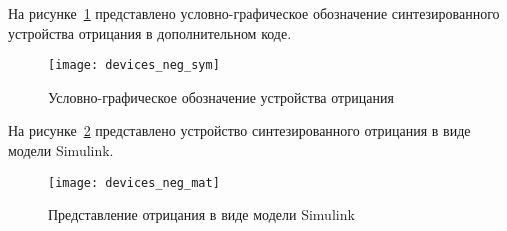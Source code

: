 \documentclass[document.tex]{subfiles}
\begin{document}
На рисунке~\ref{fig:deviceneg} представлено условно-графическое обозначение
синтезированного устройства отрицания в дополнительном коде.

\begin{figure}[here]
\centering
\texttt{[image: devices\_neg\_sym]}
\caption{Условно-графическое обозначение устройства отрицания}
\label{fig:deviceneg}
\end{figure}

\clearpage

На рисунке~\ref{fig:devicenegmat} представлено устройство
синтезированного отрицания в виде модели Simulink.

\begin{figure}[here]
\texttt{[image: devices\_neg\_mat]}
\caption{Представление отрицания в виде модели Simulink}
\label{fig:devicenegmat}
\end{figure}
\end{document}
